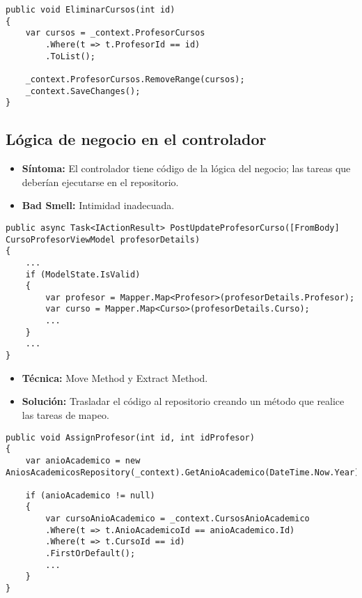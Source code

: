 \begin{lstlisting}[language={[Sharp]C}]
public void EliminarCursos(int id)
{
	var cursos = _context.ProfesorCursos
		.Where(t => t.ProfesorId == id)
		.ToList();
	
	_context.ProfesorCursos.RemoveRange(cursos);
	_context.SaveChanges();
}
\end{lstlisting}

\break
\subsection{Lógica de negocio en el controlador}
\begin{itemize}
	\item \textbf{Síntoma:} El controlador tiene código de la lógica del negocio; las tareas que deberían ejecutarse en el repositorio.
	\item \textbf{Bad Smell:} Intimidad inadecuada.
\end{itemize}

\begin{lstlisting}[language={[Sharp]C}]
public async Task<IActionResult> PostUpdateProfesorCurso([FromBody] CursoProfesorViewModel profesorDetails)
{
	...
	if (ModelState.IsValid)
	{
		var profesor = Mapper.Map<Profesor>(profesorDetails.Profesor);
		var curso = Mapper.Map<Curso>(profesorDetails.Curso);
		...
	}
	...
}
\end{lstlisting}

\begin{itemize}
	\item \textbf{Técnica:} Move Method y Extract Method.
	\item \textbf{Solución:} Trasladar el código al repositorio creando un método que realice las tareas de mapeo.
\end{itemize}

\begin{lstlisting}[language={[Sharp]C}]
public void AssignProfesor(int id, int idProfesor)
{
	var anioAcademico = new AniosAcademicosRepository(_context).GetAnioAcademico(DateTime.Now.Year);

	if (anioAcademico != null)
	{
		var cursoAnioAcademico = _context.CursosAnioAcademico
		.Where(t => t.AnioAcademicoId == anioAcademico.Id)
		.Where(t => t.CursoId == id)
		.FirstOrDefault();	
		...
	}
}
\end{lstlisting}



